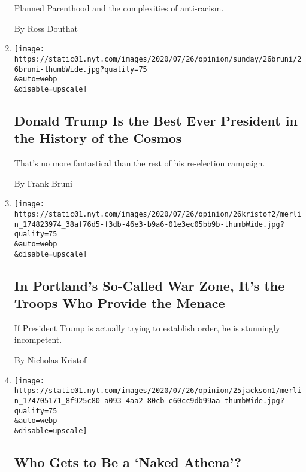 \begin{enumerate}
  Planned Parenthood and the complexities of anti-racism.

  By Ross Douthat
\item
  \href{/2020/07/25/opinion/sunday/trump-lies.html}{}

  \texttt{[image: https://static01.nyt.com/images/2020/07/26/opinion/sunday/26bruni/26bruni-thumbWide.jpg?quality=75\\\&auto=webp\\\&disable=upscale]}

  \hypertarget{donald-trump-is-the-best-ever-president-in-the-history-of-the-cosmos}{%
  \subsection{Donald Trump Is the Best Ever President in the History of
  the
  Cosmos}\label{donald-trump-is-the-best-ever-president-in-the-history-of-the-cosmos}}

  That's no more fantastical than the rest of his re-election campaign.

  By Frank Bruni
\item
  \href{/2020/07/25/opinion/sunday/portland-protest-federal-troops.html}{}

  \texttt{[image: https://static01.nyt.com/images/2020/07/26/opinion/26kristof2/merlin\_174823974\_38af76d5-f3db-46e3-b9a6-01e3ec05bb9b-thumbWide.jpg?quality=75\\\&auto=webp\\\&disable=upscale]}

  \hypertarget{in-portlands-so-called-war-zone-its-the-troops-who-provide-the-menace}{%
  \subsection{In Portland's So-Called War Zone, It's the Troops Who
  Provide the
  Menace}\label{in-portlands-so-called-war-zone-its-the-troops-who-provide-the-menace}}

  If President Trump is actually trying to establish order, he is
  stunningly incompetent.

  By Nicholas Kristof
\item
  \href{/2020/07/25/opinion/sunday/portland-protests-white.html}{}

  \texttt{[image: https://static01.nyt.com/images/2020/07/26/opinion/25jackson1/merlin\_174705171\_8f925c80-a093-4aa2-80cb-c60cc9db99aa-thumbWide.jpg?quality=75\\\&auto=webp\\\&disable=upscale]}

  \hypertarget{who-gets-to-be-a-naked-athena}{%
  \subsection{Who Gets to Be a `Naked
  Athena'?}\label{who-gets-to-be-a-naked-athena}}


\end{enumerate}
